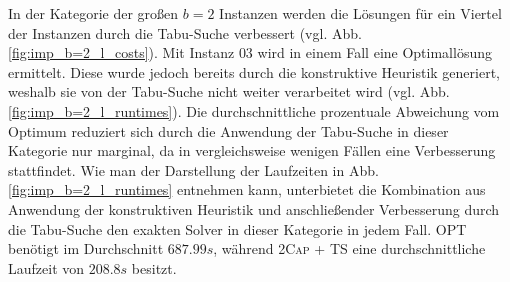In der Kategorie der großen $b = 2$ Instanzen werden die Lösungen für ein Viertel der Instanzen durch
die Tabu-Suche verbessert (vgl. Abb. \ref{fig:imp_b=2_l_costs}).
Mit Instanz $03$ wird in einem Fall eine Optimallösung ermittelt. Diese wurde jedoch bereits durch die
konstruktive Heuristik generiert, weshalb sie von der Tabu-Suche nicht weiter verarbeitet wird
(vgl. Abb. \ref{fig:imp_b=2_l_runtimes}). Die durchschnittliche prozentuale Abweichung vom Optimum reduziert
sich durch die Anwendung der Tabu-Suche in dieser Kategorie nur marginal, da in vergleichsweise wenigen
Fällen eine Verbesserung stattfindet.
Wie man der Darstellung der Laufzeiten in Abb. \ref{fig:imp_b=2_l_runtimes} entnehmen kann, unterbietet die
Kombination aus Anwendung der konstruktiven Heuristik und anschließender Verbesserung durch die Tabu-Suche
den exakten Solver in dieser Kategorie in jedem Fall. \textsc{OPT} benötigt im Durchschnitt $687.99s$,
während \textsc{2Cap + TS} eine durchschnittliche Laufzeit von $208.8s$ besitzt.

